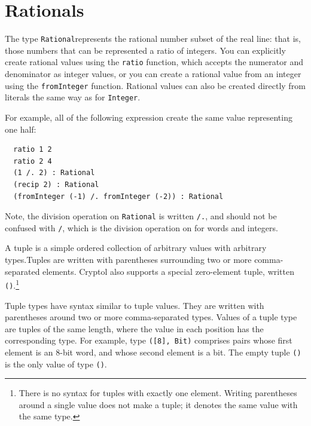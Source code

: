 \section{Rationals}
\label{sec:rational}

The type \texttt{Rational}\indTheRationalType represents the rational number subset
of the real line: that is, those numbers that can be represented
a ratio of integers. You can explicitly create rational values using
the \texttt{ratio} function, which accepts the numerator and denominator
as integer values, or you can create a rational value from an
integer using the \texttt{fromInteger} function.  Rational values can
also be created directly from literals the same way as for
\texttt{Integer}.

For example, all of the following expression create the same
value representing one half:
\begin{Verbatim}
  ratio 1 2
  ratio 2 4
  (1 /. 2) : Rational
  (recip 2) : Rational
  (fromInteger (-1) /. fromInteger (-2)) : Rational
\end{Verbatim}

Note, the division operation on \texttt{Rational} is
written \texttt{/.}, and should not be confused with
\texttt{/}, which is the division operation on for words
and integers.



A tuple is a simple ordered collection of arbitrary values with
arbitrary types.\indTheTupleType Tuples are written with parentheses
surrounding two or more comma-separated elements. Cryptol also
supports a special zero-element tuple, written
\texttt{()}.\footnote{There is no syntax for tuples with exactly one
  element. Writing parentheses around a single value does not make a
  tuple; it denotes the same value with the same type.}

Tuple types have syntax similar to tuple values. They are written with
parentheses around two or more comma-separated types. Values of a
tuple type are tuples of the same length, where the value in each
position has the corresponding type. For example, type \texttt{([8],
  Bit)} comprises pairs whose first element is an 8-bit word, and whose
second element is a bit. The empty tuple \texttt{()} is the only value
of type \texttt{()}.

